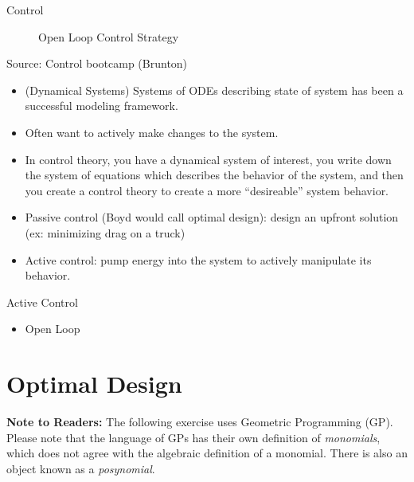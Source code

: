 \begin{chapter}{Control}
    \begin{figure}[h!]
        \centering
        \caption{Open Loop Control Strategy}
        \label{fig:block_diagram}
    \end{figure}

    Source: Control bootcamp (Brunton)
    \begin{itemize}
        \item (Dynamical Systems) Systems of ODEs describing state of system has been a successful modeling framework.
        \item Often want to actively make changes to the system. 
        \item In control theory, you have a dynamical system of interest, you write down the system of equations 
        which describes the behavior of the system, and then you create a control theory to create a more ``desireable''
        system behavior.
        \item Passive control (Boyd would call optimal design): design an upfront solution (ex: minimizing drag on a truck)
        \item Active control: pump energy into the system to actively manipulate its behavior.
    \end{itemize}

    \noindent Active Control
    \begin{itemize}
        \item Open Loop
    \end{itemize}

    \section{Optimal Design}

    \textbf{Note to Readers:} The following exercise uses Geometric Programming (GP). Please note that
    the language of GPs has their own definition of \textit{monomials}, which does not agree with the 
    algebraic definition of a monomial. There is also an object known as a \textit{posynomial}.


\end{chapter}
